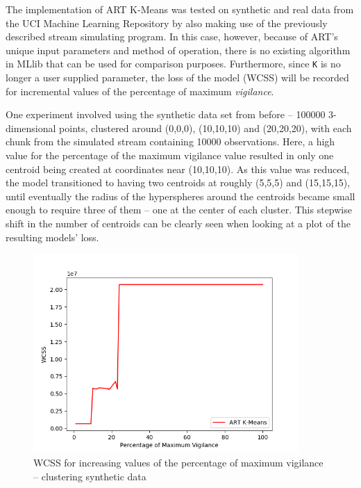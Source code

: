 \documentclass{l4proj}
\begin{document}
The implementation of ART K-Means was tested on synthetic and real data from the UCI Machine Learning Repository by also making use of the previously described stream simulating program. In this case, however, because of ART's unique input parameters and method of operation, there is no existing algorithm in MLlib that can be used for comparison purposes. Furthermore, since \texttt{K} is no longer a user supplied parameter, the loss of the model (WCSS) will be recorded for incremental values of the percentage of maximum \textit{vigilance}.

One experiment involved using the synthetic data set from before -- 100000 3-dimensional points, clustered around (0,0,0), (10,10,10) and (20,20,20), with each chunk from the simulated stream containing 10000 observations. Here, a high value for the percentage of the maximum vigilance value resulted in only one centroid being created at coordinates near (10,10,10). As this value was reduced, the model transitioned to having two centroids at roughly (5,5,5) and (15,15,15), until eventually the radius of the hyperspheres around the centroids became small enough to require three of them -- one at the center of each cluster. This stepwise shift in the number of centroids can be clearly seen when looking at a plot of the resulting models' loss.

\begin{figure}[H]
	\centering
    \label{fig:res12}
    \includegraphics[width=0.9\textwidth]{images/result12}
    \caption{WCSS for increasing values of the percentage of maximum vigilance -- clustering synthetic data} 
\end{figure}
\end{document}
